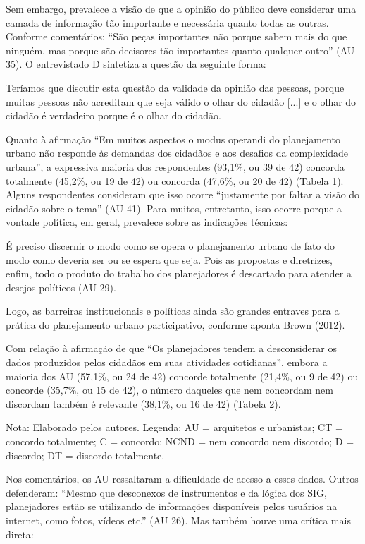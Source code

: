 \documentclass{article}
\begin{document}
\begin{multicols}{2}
Sem embargo, prevalece a visão de que a opinião do público deve considerar uma
camada de informação tão importante e necessária quanto todas as outras.
Conforme comentários: “São peças importantes não porque sabem mais do
que ninguém, mas porque são decisores tão importantes quanto qualquer
outro” (AU 35). O entrevistado D sintetiza a questão da seguinte
forma:

Teríamos que discutir esta questão da validade da opinião das pessoas, porque
muitas pessoas não acreditam que seja válido o olhar do cidadão
[...] e o olhar do cidadão é verdadeiro porque é o
olhar do cidadão.

Quanto à afirmação “Em muitos aspectos o modus operandi do planejamento
urbano não responde às demandas dos cidadãos e aos desafios da complexidade
urbana”, a expressiva maioria dos respondentes (93,1\%, ou 39 de 42)
concorda totalmente (45,2\%, ou 19 de 42) ou concorda (47,6\%, ou 20 de 42)
(Tabela 1). Alguns respondentes consideram
que isso ocorre “justamente por faltar a visão do cidadão sobre o
tema” (AU 41). Para muitos, entretanto, isso ocorre porque a
vontade política, em geral, prevalece sobre as indicações técnicas:

É preciso discernir o modo como se opera o planejamento urbano de fato do
modo como deveria ser ou se espera que seja. Pois as propostas e diretrizes,
enfim, todo o produto do trabalho dos planejadores é descartado para atender
a desejos políticos (AU 29).

Logo, as barreiras institucionais e políticas ainda são grandes entraves para a
prática do planejamento urbano participativo, conforme aponta Brown (2012).

Com relação à afirmação de que “Os planejadores tendem a desconsiderar os
dados produzidos pelos cidadãos em suas atividades cotidianas”,
embora a maioria dos AU (57,1\%, ou 24 de 42) concorde totalmente (21,4\%, ou 9
de
42) ou concorde (35,7\%, ou 15 de 42), o número daqueles que nem concordam nem
discordam também é relevante (38,1\%, ou 16 de 42) (Tabela 2).

Nota: Elaborado pelos autores. Legenda: AU = arquitetos e urbanistas;
CT = concordo totalmente; C = concordo; NCND = nem concordo nem
discordo; D = discordo; DT = discordo totalmente.

Nos comentários, os AU ressaltaram a dificuldade de acesso a esses dados. Outros
defenderam: “Mesmo que desconexos de instrumentos e da lógica dos SIG,
planejadores estão se utilizando de informações disponíveis pelos usuários
na internet, como fotos, vídeos etc.” (AU 26). Mas também houve uma
crítica mais direta:


\end{multicols}
\end{document}
